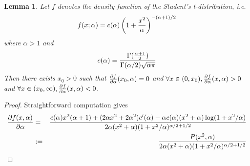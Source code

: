 \documentclass[11pt,a4]{amsart}
\newcommand{\pd}{\partial}
\newtheorem{lemma}{Lemma}[section]
\newcommand{\1}{{\mathbf 1}}
\begin{document}
\begin{lemma}
  \label{lemma:II}
  Let $f$ denotes the density function of the Student's
  t-distribution, i.e.
  \[
  f(x; \alpha) = c(\alpha) \left(
    1 + {x^2 \over \alpha}
  \right)^{-(\alpha + 1)/2}
  \]
  where $\alpha > 1$ and
  \[
  c(\alpha) = {
    \Gamma({\alpha + 1 \over 2})
    \over
    \Gamma(\alpha/2) \sqrt{\alpha \pi}
  }
  \]
  Then there exists $x_0 > 0$ such that ${\pd f \over
    \pd \alpha}(x_0, \alpha) = 0$ and $\forall x \in (0, x_0), {\pd f \over
    \pd \alpha}(x, \alpha) > 0$ and $\forall x \in (x_0, \infty), {\pd f
    \over \pd \alpha}(x, \alpha) < 0$.
\end{lemma}
\begin{proof}
  Straightforward computation gives
  \begin{eqnarray}
    {\pd f(x, \alpha) \over \pd \alpha} &=& {
      c(\alpha) x^2 (\alpha + 1) + (2 \alpha x^2 + 2 \alpha^2) c'(\alpha)
      -
      \alpha c(\alpha) (x^2 + \alpha) \log(1 + x^2/\alpha)
      \over
      2 \alpha (x^2 + \alpha) (1 + x^2 / \alpha)^{\alpha/2 + 1/2}
    } \nonumber \\
    &:=& {
      P(x^2, \alpha)
      \over
      2 \alpha (x^2 + \alpha) (1 + x^2 / \alpha)^{\alpha/2 + 1/2}
    }
    \label{eq:xxie4.1}
  \end{eqnarray}


\end{proof}
\end{document}
